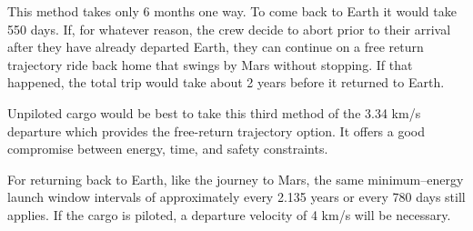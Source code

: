 This method takes only 6 months one way. To come back to Earth it would take 550 days. If, for whatever reason, the crew decide to abort prior to their arrival after they have already departed Earth, they can continue on a free return trajectory ride back home that swings by Mars without stopping. If that happened, the total trip would take about 2 years before it returned to Earth.

Unpiloted cargo would be best to take this third method of the 3.34 km/s departure which provides the free-return trajectory option. It offers a good compromise between energy, time, and safety constraints.

For returning back to Earth, like the journey to Mars, the same minimum--energy launch window intervals of approximately every 2.135 years or every 780 days still applies. If the cargo is piloted, a departure velocity of 4 km/s will be necessary.

